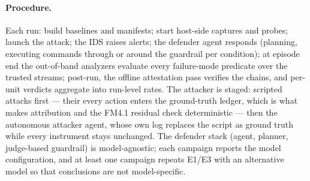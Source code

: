 \paragraph{Procedure.}
Each run: build baselines and manifests; start host-side captures and probes; launch the attack; the IDS raises alerts; the defender agent responds (planning, executing commands through or around the guardrail per condition); at episode end the out-of-band analyzers evaluate every failure-mode predicate over the trusted streams; post-run, the offline attestation pass verifies the chains, and per-unit verdicts aggregate into run-level rates. The attacker is staged: scripted attacks first --- their every action enters the ground-truth ledger, which is what makes attribution and the FM4.1 residual check deterministic --- then the autonomous attacker agent, whose own log replaces the script as ground truth while every instrument stays unchanged. The defender stack (agent, planner, judge-based guardrail) is model-agnostic; each campaign reports the model configuration, and at least one campaign repeats E1/E3 with an alternative model so that conclusions are not model-specific.

